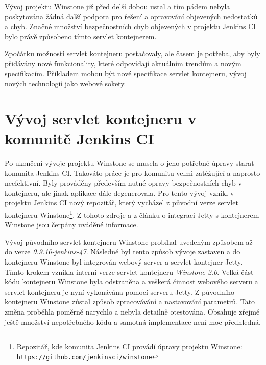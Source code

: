             Vývoj projektu Winstone již před delší dobou ustal a tím pádem nebyla poskytována 
            žádná další podpora pro řešení a opravování objevených nedostatků a chyb. 
            Značné množství bezpečnostních chyb objevených v projektu Jenkins CI bylo právě
            způsobeno tímto servlet kontejnerem.

            Zpočátku možnosti servlet kontejneru postačovaly, ale časem je potřeba, aby 
            byly přidávány nové funkcionality, které odpovídají aktuálním trendům a 
            novým specifikacím. Příkladem mohou být nové specifikace servlet kontejneru,
            vývoj nových technologií jako webové sokety.


    \section{Vývoj servlet kontejneru v komunitě Jenkins CI} \label{vyvojWinstone}
        Po ukončení vývoje projektu Winstone se musela o jeho potřebné úpravy starat komunita
        Jenkins CI. Takováto práce je pro komunitu velmi zatěžující
        a naprosto neefektivní. Byly prováděny především nutné opravy bezpečnostních chyb v kontejneru,
        ale jinak aplikace dále degenerovala. Pro tento vývoj vznikl v projektu Jenkins CI nový 
        repozitář, který vycházel z původní verze servlet kontejneru 
        Winstone\footnote{Repozitář, kde komunita Jenkins CI provádí úpravy projektu Winstone:
        \texttt{https://github.com/jenkinsci/winstone}}. Z tohoto zdroje
        a z článku o integraci Jetty s kontejnerem Winstone \cite{kohsukeTopic} jsou čerpány uváděné informace. 
        
        \medskip
        Vývoj původního servlet kontejneru Winstone probíhal uvedeným způsobem 
        až do verze \emph{0.9.10-jenkins-47}. Následně byl tento způsob vývoje zastaven
        a do kontejneru Winstone byl integrován webový server a servlet kontejner
        Jetty. Tímto krokem vznikla 
        interní verze servlet kontejneru \emph{Winstone 2.0}. Velká část kódu 
        kontejneru Winstone byla odstraněna a veškerá činnost webového serveru a servlet 
        kontejneru je nyní vykonávána pomocí serveru Jetty. Z původního kontejneru Winstone
        zůstal způsob zpracovávání a nastavování parametrů. 
        Tato změna proběhla poměrně narychlo
        a nebyla detailně otestována. Obsahuje zřejmě ještě množství nepotřebného kódu a 
        samotná implementace není moc předhledná.

